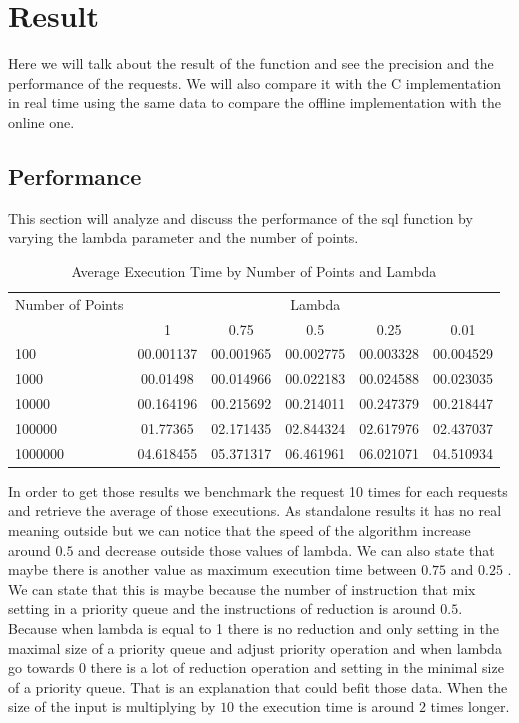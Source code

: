 
\chapter{Result}

Here we will talk about the result of the function and see the precision and the performance of the requests. We will also compare it with the C implementation in real time using the same data to compare the offline implementation with the online one.

\section{Performance}
This section will analyze and discuss the performance of the sql function by varying the lambda parameter and the number of points.
\begin{table}[htbp]
    \centering
    \label{tab:execution_time}
    \begin{tabular}{@{}lccccc@{}}
        \toprule
        Number of Points & \multicolumn{5}{c}{Lambda} \\
        \cmidrule{2-6}
        & 1         & 0.75       & 0.5        & 0.25       & 0.01       \\
        \midrule
        100              & 00.001137 & 00.001965 & 00.002775 & 00.003328 & 00.004529 \\
        1000             & 00.01498  & 00.014966 & 00.022183 & 00.024588 & 00.023035 \\
        10000            & 00.164196 & 00.215692 & 00.214011 & 00.247379 & 00.218447 \\
        100000           & 01.77365  & 02.171435 & 02.844324 & 02.617976 & 02.437037 \\
        1000000          & 04.618455 & 05.371317 & 06.461961 & 06.021071 & 04.510934 \\
        \bottomrule
    \end{tabular}
    \caption{Average Execution Time by Number of Points and Lambda}
\end{table}

In order to get those results we benchmark the request 10 times for each requests and retrieve the average of those executions. As standalone results it has no real meaning outside but we can notice that the speed of the algorithm increase around $0.5$ and decrease outside those values of lambda. We can also state that maybe there is another value as maximum execution time between $0.75$ and $0.25$ . We can state that this is maybe because the number of instruction that mix setting in a priority queue and the instructions of reduction is around $0.5$. Because when lambda is equal to 1 there is no reduction and only setting in the maximal size of a priority queue and adjust priority operation and when lambda go towards $0$ there is a lot of reduction operation and setting in the minimal size of a priority queue. That is an explanation that could befit those data. When the size of the input is multiplying by $10$ the execution time is around $2$ times longer.


